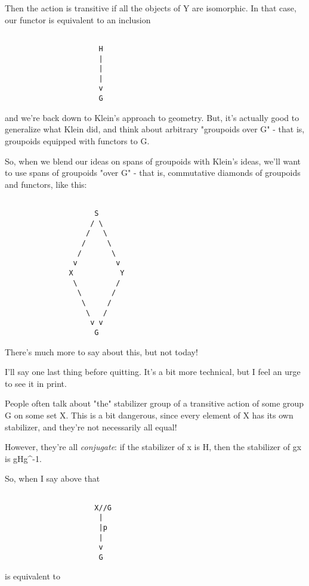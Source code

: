 Then the action is transitive if all the objects of Y are isomorphic.  
In that case, our functor is equivalent to an inclusion


\begin{verbatim}

                      H
                      |
                      |
                      |
                      v
                      G
\end{verbatim}
    
and we're back down to Klein's approach to geometry.  But, it's actually 
good to generalize what Klein did, and think about arbitrary "groupoids
over G" - that is, groupoids equipped with functors to G.

So, when we blend our ideas on spans of groupoids with Klein's ideas,
we'll want to use spans of groupoids "over G" - that is,
commutative diamonds of groupoids and functors, like this:
  

\begin{verbatim}

                     S
                    / \
                   /   \
                  /     \
                 /       \
                v         v
               X           Y
                \         /
                 \       /
                  \     /
                   \   /
                    v v
                     G
\end{verbatim}
    
There's much more to say about this, but not today!

I'll say one last thing before quitting.  It's a bit more technical, 
but I feel an urge to see it in print.  

People often talk about "the" stabilizer group of a transitive action 
of some group G on some set X.  This is a bit dangerous, since every 
element of X has its own stabilizer, and they're not necessarily all equal!

However, they're all \emph{conjugate}: if the stabilizer of x is H, 
then the stabilizer of gx is gHg^{-1}.  

So, when I say above that 


\begin{verbatim}

                     X//G 
                      |
                      |p
                      |
                      v
                      G
\end{verbatim}
    
is equivalent to 


